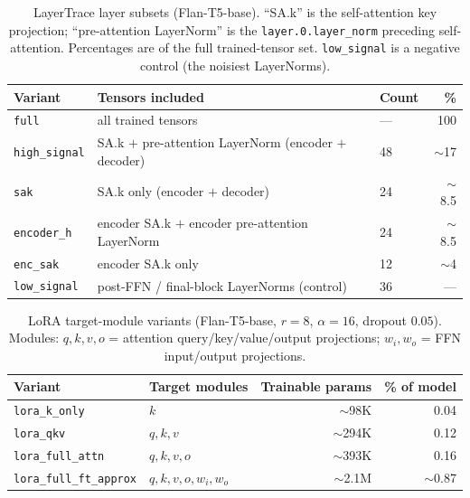 \documentclass{article}
\theoremstyle{definition}
\theoremstyle{plain}
\begin{document}
\begin{table}[h]
\caption{LayerTrace layer subsets (Flan-T5-base). ``SA.k'' is the self-attention key projection;
``pre-attention LayerNorm'' is the \texttt{layer.0.layer\_norm} preceding self-attention. Percentages
are of the full trained-tensor set. \texttt{low\_signal} is a negative control (the noisiest LayerNorms).}
\label{tab:layer_subsets}
\centering
\begin{tabular}{lll r}
\toprule
Variant & Tensors included & Count & \% \\
\midrule
\texttt{full}        & all trained tensors                                   & ---  & 100 \\
\texttt{high\_signal}& SA.k $+$ pre-attention LayerNorm (encoder $+$ decoder) & 48   & $\sim$17 \\
\texttt{sak}         & SA.k only (encoder $+$ decoder)                       & 24   & $\sim$8.5 \\
\texttt{encoder\_h}  & encoder SA.k $+$ encoder pre-attention LayerNorm      & 24   & $\sim$8.5 \\
\texttt{enc\_sak}    & encoder SA.k only                                     & 12   & $\sim$4 \\
\texttt{low\_signal} & post-FFN / final-block LayerNorms (control)           & 36   & --- \\
\bottomrule
\end{tabular}
\end{table}

\begin{table}[h]
\caption{LoRA target-module variants (Flan-T5-base, $r=8$, $\alpha=16$, dropout $0.05$). Modules:
$q,k,v,o$ = attention query/key/value/output projections; $w_i,w_o$ = FFN input/output projections.}
\label{tab:lora_variants}
\centering
\begin{tabular}{ll r r}
\toprule
Variant & Target modules & Trainable params & \% of model \\
\midrule
\texttt{lora\_k\_only}        & $k$                       & $\sim$98K  & 0.04 \\
\texttt{lora\_qkv}            & $q,k,v$                   & $\sim$294K & 0.12 \\
\texttt{lora\_full\_attn}     & $q,k,v,o$                 & $\sim$393K & 0.16 \\
\texttt{lora\_full\_ft\_approx}& $q,k,v,o,w_i,w_o$        & $\sim$2.1M & $\sim$0.87 \\
\bottomrule
\end{tabular}
\end{table}
\end{document}
